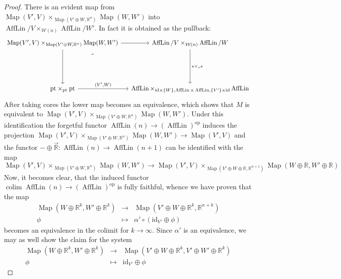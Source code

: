 \documentclass{article}
\newcommand{\R}{\mathbb{R}} %
\newcommand{\cO}{\AffLin}
\newcommand{\pt}{\mathrm{pt}}
\newcommand{\op}{\mathrm{op}}
\newcommand{\id}{\mathrm{id}}
\DeclareMathOperator{\AffLin}{AffLin}
\DeclareMathOperator{\Map}{Map}
\DeclareMathOperator*{\colim}{colim}
\begin{document}
\begin{proof}
    There is an evident map from
    $\Map(V',V) \times_{\Map(V'\oplus W,\R^n)} \Map(W,W')$
    into $\cO/V \times_{{\mathcal W(n)}} \cO/W'$. In fact it is obtained
    as the pullback:
    \[\begin{tikzcd}[column sep=tiny]
        {\Map(V',V)\times_{\Map(V'\oplus W,\R^n)}\Map(W,W')} && {\cO/V \times_{{\mathcal W(n)}}\cO/W} \\
        \\
        \\
        {\pt \times_{\pt} \pt} && {\cO \times_{\id\times\{W\},\cO \times \cO,\{V'\}\times\id}\cO}
        \arrow[from=1-1, to=4-1]
        \arrow["{(V',W)}", from=4-1, to=4-3]
        \arrow["{s\times_ss}", from=1-3, to=4-3]
        \arrow[from=1-1, to=1-3]
        \arrow["\lrcorner"{anchor=center, pos=0.125}, draw=none, from=1-1, to=4-3]
      \end{tikzcd}\]
    After taking cores the lower map becomes an equivalence, which shows that
    $M$ is equivalent to $\Map(V',V) \times_{\Map(V'\oplus W,\R^n)} \Map(W,W')$.
    Under this identification the forgetful functor $\cO(n) \to (\cO)^\op$
    induces the projection $\Map(V',V) \times_{\Map(V'\oplus W,\R^n)} \Map(W,W') \to \Map(V',V)$
    and the functor $-\oplus \overrightarrow{\R} \colon \cO(n) \to \cO(n+1)$
    can be identified with the map
    \[
      \Map(V',V) \times_{\Map(V'\oplus W,\R^n)} \Map(W,W') \to
      \Map(V',V) \times_{\Map(V'\oplus W \oplus \R,\R^{n+1})} \Map(W\oplus \R,W'\oplus \R)
    \]
    Now, it becomes clear, that the induced functor
    $\colim \cO(n) \to (\cO)^\op$ is fully faithful,
    whence we have proven that the map
    \begin{eqnarray*}
      \Map(W\oplus \R^k, W' \oplus \R^k) &\to& \Map(V' \oplus W \oplus \R^k, \R^{n+k}) \\
      \phi &\mapsto & \alpha' \circ (\id_{V'} \oplus \phi)
    \end{eqnarray*}
    becomes an equivalence in the colimit for $k \to \infty$.
    Since $\alpha'$ is an equivalence, we may as well show the claim for the system
    \begin{eqnarray*}
      \Map(W\oplus \R^k, W' \oplus \R^k) &\to&
      \Map(V' \oplus W \oplus \R^k, V' \oplus W' \oplus \R^k) \\
      \phi &\mapsto & \id_{V'} \oplus \phi
    \end{eqnarray*}
  

\end{proof}
\end{document}
